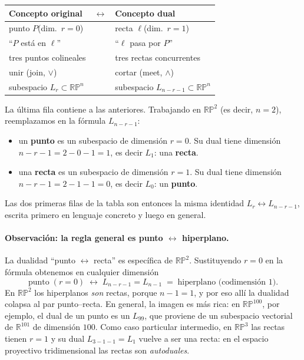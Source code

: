 \documentclass[11pt,a4paper]{article}
\newcommand{\RP}{\mathbb{RP}}
\newcommand{\R}{\mathbb{R}}
\begin{document}
\begin{center}
\renewcommand{\arraystretch}{1.15}
\begin{tabular}{@{}lcl@{}}
\toprule
\textbf{Concepto original} & $\longleftrightarrow$ & \textbf{Concepto dual}\\
\midrule
punto $P$\quad (dim.\ $r=0$) & & recta $\ell$\quad (dim.\ $r=1$)\\
``$P$ está en $\ell$'' & & ``$\ell$ pasa por $P$''\\
tres puntos colineales & & tres rectas concurrentes\\
unir (join, $\vee$) & & cortar (meet, $\wedge$)\\
subespacio $L_r\subset\RP^n$ & & subespacio $L_{n-r-1}\subset\RP^n$\\
\bottomrule
\end{tabular}
\end{center}

\noindent La última fila contiene a las anteriores. Trabajando en
$\RP^2$ (es decir, $n=2$), reemplazamos en la fórmula $L_{n-r-1}$:
\begin{itemize}[leftmargin=1.4em,itemsep=1pt]
\item un \textbf{punto} es un subespacio de dimensión $r=0$. Su dual
  tiene dimensión $n-r-1 = 2-0-1 = 1$, es decir $L_1$: una \textbf{recta}.
\item una \textbf{recta} es un subespacio de dimensión $r=1$. Su dual
  tiene dimensión $n-r-1 = 2-1-1 = 0$, es decir $L_0$: un \textbf{punto}.
\end{itemize}
Las dos primeras filas de la tabla son entonces la misma identidad
$L_r\leftrightarrow L_{n-r-1}$, escrita primero en lenguaje concreto y
luego en general.

\paragraph{Observación: la regla general es punto $\leftrightarrow$ hiperplano.}
La dualidad ``punto $\leftrightarrow$ recta'' es específica de $\RP^2$.
Sustituyendo $r=0$ en la fórmula obtenemos en cualquier dimensión
\[
  \text{punto}\;(r=0)\;\longleftrightarrow\;
  L_{n-r-1}=L_{n-1}\;=\;\text{hiperplano (codimensión 1).}
\]
En $\RP^2$ los hiperplanos \emph{son} rectas, porque $n-1=1$, y por eso
allí la dualidad colapsa al par punto--recta. En general, la imagen es
más rica: en $\RP^{100}$, por ejemplo, el dual de un punto es un
$L_{99}$, que proviene de un subespacio vectorial de $\R^{101}$ de
dimensión $100$. Como caso particular intermedio, en $\RP^3$ las rectas
tienen $r=1$ y su dual $L_{3-1-1}=L_{1}$ vuelve a ser una recta: en el
espacio proyectivo tridimensional las rectas son \emph{autoduales}.
\end{document}
